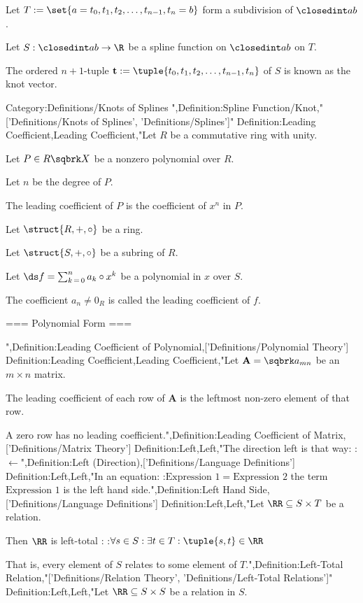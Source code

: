 Let $T := \set {a = t_0, t_1, t_2, \ldots, t_{n - 1}, t_n = b}$ form a subdivision of $\closedint a b$.

Let $S: \closedint a b \to \R$ be a spline function on $\closedint a b$ on $T$.


The ordered $n + 1$-tuple $\mathbf t := \tuple {t_0, t_1, t_2, \ldots, t_{n - 1}, t_n}$ of $S$ is known as the knot vector.


Category:Definitions/Knots of Splines
",Definition:Spline Function/Knot,"['Definitions/Knots of Splines', 'Definitions/Splines']"
Definition:Leading Coefficient,Leading Coefficient,"Let $R$ be a commutative ring with unity.

Let $P \in R \sqbrk X$ be a nonzero polynomial over $R$.

Let $n$ be the degree of $P$.


The leading coefficient of $P$ is the coefficient of $x^n$ in $P$.



Let $\struct {R, +, \circ}$ be a ring.

Let $\struct {S, +, \circ}$ be a subring of $R$.

Let $\ds f = \sum_{k \mathop = 0}^n a_k \circ x^k$ be a polynomial in $x$ over $S$.


The coefficient $a_n \ne 0_R$ is called the leading coefficient of $f$.


=== Polynomial Form ===

",Definition:Leading Coefficient of Polynomial,['Definitions/Polynomial Theory']
Definition:Leading Coefficient,Leading Coefficient,"Let $\mathbf A = \sqbrk a_{m n}$ be an $m \times n$ matrix.

The leading coefficient of each row of $\mathbf A$ is the leftmost non-zero element of that row.


A zero row has no leading coefficient.",Definition:Leading Coefficient of Matrix,['Definitions/Matrix Theory']
Definition:Left,Left,"The direction left is that way:
:$\gets$",Definition:Left (Direction),['Definitions/Language Definitions']
Definition:Left,Left,"In an equation:
:$\text {Expression $1$} = \text {Expression $2$}$
the term $\text {Expression $1$}$ is the left hand side.",Definition:Left Hand Side,['Definitions/Language Definitions']
Definition:Left,Left,"Let $\RR \subseteq S \times T$ be a relation.


Then $\RR$ is left-total :
:$\forall s \in S: \exists t \in T: \tuple {s, t} \in \RR$


That is,  every element of $S$ relates to some element of $T$.",Definition:Left-Total Relation,"['Definitions/Relation Theory', 'Definitions/Left-Total Relations']"
Definition:Left,Left,"Let $\RR \subseteq S \times S$ be a relation in $S$.


